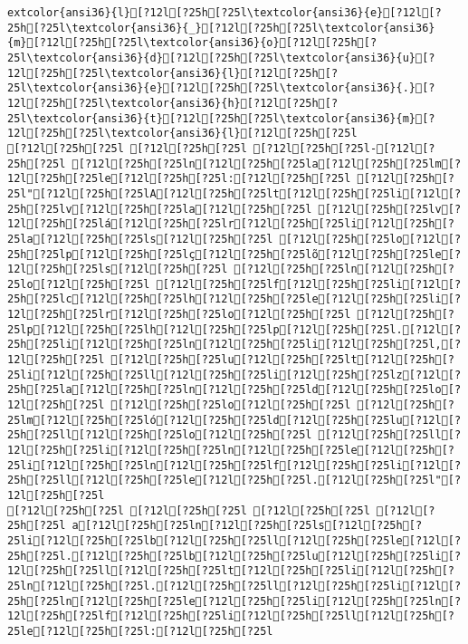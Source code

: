 \documentclass{scrartcl}
\begin{document}
\begin{Verbatim}
extcolor{ansi36}{l}[?12l[?25h[?25l\textcolor{ansi36}{e}[?12l[?25h[?25l\textcolor{ansi36}{_}[?12l[?25h[?25l\textcolor{ansi36}{m}[?12l[?25h[?25l\textcolor{ansi36}{o}[?12l[?25h[?25l\textcolor{ansi36}{d}[?12l[?25h[?25l\textcolor{ansi36}{u}[?12l[?25h[?25l\textcolor{ansi36}{l}[?12l[?25h[?25l\textcolor{ansi36}{e}[?12l[?25h[?25l\textcolor{ansi36}{.}[?12l[?25h[?25l\textcolor{ansi36}{h}[?12l[?25h[?25l\textcolor{ansi36}{t}[?12l[?25h[?25l\textcolor{ansi36}{m}[?12l[?25h[?25l\textcolor{ansi36}{l}[?12l[?25h[?25l
[?12l[?25h[?25l [?12l[?25h[?25l [?12l[?25h[?25l-[?12l[?25h[?25l [?12l[?25h[?25ln[?12l[?25h[?25la[?12l[?25h[?25lm[?12l[?25h[?25le[?12l[?25h[?25l:[?12l[?25h[?25l [?12l[?25h[?25l"[?12l[?25h[?25lA[?12l[?25h[?25lt[?12l[?25h[?25li[?12l[?25h[?25lv[?12l[?25h[?25la[?12l[?25h[?25l [?12l[?25h[?25lv[?12l[?25h[?25lá[?12l[?25h[?25lr[?12l[?25h[?25li[?12l[?25h[?25la[?12l[?25h[?25ls[?12l[?25h[?25l [?12l[?25h[?25lo[?12l[?25h[?25lp[?12l[?25h[?25lç[?12l[?25h[?25lõ[?12l[?25h[?25le[?12l[?25h[?25ls[?12l[?25h[?25l [?12l[?25h[?25ln[?12l[?25h[?25lo[?12l[?25h[?25l [?12l[?25h[?25lf[?12l[?25h[?25li[?12l[?25h[?25lc[?12l[?25h[?25lh[?12l[?25h[?25le[?12l[?25h[?25li[?12l[?25h[?25lr[?12l[?25h[?25lo[?12l[?25h[?25l [?12l[?25h[?25lp[?12l[?25h[?25lh[?12l[?25h[?25lp[?12l[?25h[?25l.[?12l[?25h[?25li[?12l[?25h[?25ln[?12l[?25h[?25li[?12l[?25h[?25l,[?12l[?25h[?25l [?12l[?25h[?25lu[?12l[?25h[?25lt[?12l[?25h[?25li[?12l[?25h[?25ll[?12l[?25h[?25li[?12l[?25h[?25lz[?12l[?25h[?25la[?12l[?25h[?25ln[?12l[?25h[?25ld[?12l[?25h[?25lo[?12l[?25h[?25l [?12l[?25h[?25lo[?12l[?25h[?25l [?12l[?25h[?25lm[?12l[?25h[?25ló[?12l[?25h[?25ld[?12l[?25h[?25lu[?12l[?25h[?25ll[?12l[?25h[?25lo[?12l[?25h[?25l [?12l[?25h[?25ll[?12l[?25h[?25li[?12l[?25h[?25ln[?12l[?25h[?25le[?12l[?25h[?25li[?12l[?25h[?25ln[?12l[?25h[?25lf[?12l[?25h[?25li[?12l[?25h[?25ll[?12l[?25h[?25le[?12l[?25h[?25l.[?12l[?25h[?25l"[?12l[?25h[?25l
[?12l[?25h[?25l [?12l[?25h[?25l [?12l[?25h[?25l [?12l[?25h[?25l a[?12l[?25h[?25ln[?12l[?25h[?25ls[?12l[?25h[?25li[?12l[?25h[?25lb[?12l[?25h[?25ll[?12l[?25h[?25le[?12l[?25h[?25l.[?12l[?25h[?25lb[?12l[?25h[?25lu[?12l[?25h[?25li[?12l[?25h[?25ll[?12l[?25h[?25lt[?12l[?25h[?25li[?12l[?25h[?25ln[?12l[?25h[?25l.[?12l[?25h[?25ll[?12l[?25h[?25li[?12l[?25h[?25ln[?12l[?25h[?25le[?12l[?25h[?25li[?12l[?25h[?25ln[?12l[?25h[?25lf[?12l[?25h[?25li[?12l[?25h[?25ll[?12l[?25h[?25le[?12l[?25h[?25l:[?12l[?25h[?25l

\end{Verbatim}
\end{document}
